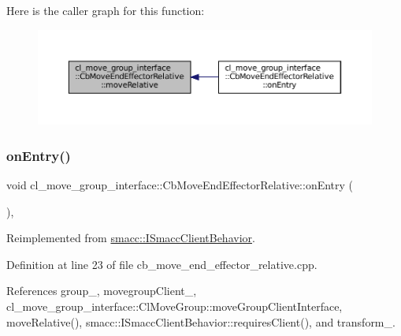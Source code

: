 Here is the caller graph for this function\+:
\nopagebreak
\begin{figure}[H]
\begin{center}
\leavevmode
\includegraphics[width=350pt]{classcl__move__group__interface_1_1CbMoveEndEffectorRelative_ab9498fefa83f46b974ce5b13df7dbd16_icgraph}
\end{center}
\end{figure}
\mbox{\label{classcl__move__group__interface_1_1CbMoveEndEffectorRelative_a805a9d0f85ecdb1f503c1d6349ed9036}} 
\subsubsection{\texorpdfstring{on\+Entry()}{onEntry()}}
{\footnotesize\ttfamily void cl\+\_\+move\+\_\+group\+\_\+interface\+::\+Cb\+Move\+End\+Effector\+Relative\+::on\+Entry (\begin{DoxyParamCaption}{ }\end{DoxyParamCaption})\hspace{0.3cm}{\ttfamily [override]}, {\ttfamily [virtual]}}



Reimplemented from \hyperlink{classsmacc_1_1ISmaccClientBehavior_a3ec24a839087c550e1d62a81e48cf530}{smacc\+::\+I\+Smacc\+Client\+Behavior}.



Definition at line 23 of file cb\+\_\+move\+\_\+end\+\_\+effector\+\_\+relative.\+cpp.



References group\+\_\+, movegroup\+Client\+\_\+, cl\+\_\+move\+\_\+group\+\_\+interface\+::\+Cl\+Move\+Group\+::move\+Group\+Client\+Interface, move\+Relative(), smacc\+::\+I\+Smacc\+Client\+Behavior\+::requires\+Client(), and transform\+\_\+.


